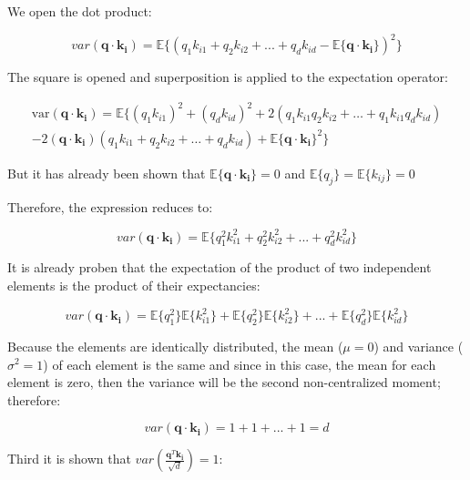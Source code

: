We open the dot product:

\begin{equation}
var(\mathbf{q} \cdot{} \mathbf{k_i})=\mathbb{E}\{(q_1k_{i1}+q_2k_{i2}+...+q_dk_{id}-\mathbb{E}\{\mathbf{q} \cdot{} \mathbf{k_i}\})^2\}
\end{equation}

The square is opened and superposition is applied to the expectation operator:

\begin{equation}
\begin{split}
\text{var}(\mathbf{q} \cdot{} \mathbf{k_i}) = \mathbb{E}\{(q_1k_{i1})^2 + (q_dk_{id})^2 + 2(q_1k_{i1}q_2k_{i2} + \dots + q_1k_{i1}q_dk_{id}) \\
- 2(\mathbf{q} \cdot{} \mathbf{k_i})(q_1k_{i1} + q_2k_{i2} + \dots + q_dk_{id}) + \mathbb{E}\{\mathbf{q} \cdot{} \mathbf{k_i}\}^2\}
\end{split}
\end{equation}

But it has already been shown that $\mathbb{E}\{\mathbf{q} \cdot{} \mathbf{k_i}\}=0$ and $\mathbb{E}\{q_j\}=\mathbb{E}\{k_{ij}\}=0$

Therefore, the expression reduces to:

\begin{equation}
    var(\mathbf{q} \cdot{} \mathbf{k_i})=\mathbb{E}\{q_1^2k_{i1}^2+q_2^2k_{i2}^2+...+q_d^2k_{id}^2\}
\end{equation}


It is already proben that the expectation of the product of two independent elements is the product of their expectancies:

\begin{equation}
    var(\mathbf{q} \cdot{} \mathbf{k_i})=\mathbb{E}\{q_1^2\}\mathbb{E}\{k_{i1}^2\}+\mathbb{E}\{q_2^2\}\mathbb{E}\{k_{i2}^2\}+...+\mathbb{E}\{q_d^2\}\mathbb{E}\{k_{id}^2\}
\end{equation}

Because the elements are identically distributed, the mean ($\mu=0$) and variance ($\sigma ^2=1$) of each element is the same and since in this case, the mean for each element is zero, then the variance will be the second non-centralized moment; therefore:

\begin{equation}
var(\mathbf{q} \cdot{} \mathbf{k_i})=1+1+...+1=d
\end{equation}

Third it is shown that $var(\frac{\mathbf{q}^{T}\mathbf{k_{i}}}{\sqrt{d}})=1:$


